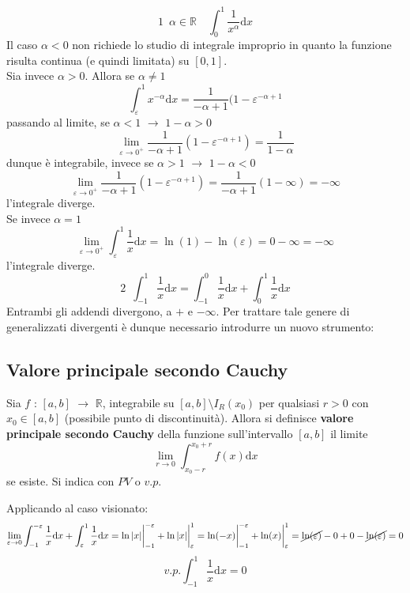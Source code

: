 \documentclass[10pt, oneside]{book}
\theoremstyle{plain}
\begin{document}
\[\boxed{1} \enspace \alpha \in \mathbb{R} \quad \int_0^1 \frac{1}{x^\alpha}\textrm{d}x\]
Il caso $\alpha < 0$ non richiede lo studio di integrale improprio in quanto la funzione risulta continua (e quindi limitata) su $[0,1]$.
\\Sia invece $\alpha > 0$. Allora se $\alpha \neq 1$
\[\int_\varepsilon^1 x^{-\alpha}\textrm{d}x = \frac{1}{-\alpha + 1}(1 - \varepsilon^{-\alpha + 1}\]
passando al limite, se $\alpha < 1$ $\rightarrow$ $1 - \alpha > 0$
\[\lim\limits_{\varepsilon \rightarrow 0^+} \frac{1}{-\alpha + 1}(1 - \varepsilon^{-\alpha + 1}) = \frac{1}{1 - \alpha}\]
dunque è integrabile, invece se $\alpha > 1$ $\rightarrow$ $1- \alpha <0$
\[\lim\limits_{\varepsilon \rightarrow 0^+} \frac{1}{-\alpha + 1}(1 - \varepsilon^{-\alpha + 1}) = \frac{1}{-\alpha + 1}(1 - \infty) = - \infty\]
l'integrale diverge.
\\Se invece $\alpha = 1$
\[\lim\limits_{\varepsilon \rightarrow 0^+} \int_\varepsilon^1 \frac{1}{x}\textrm{d}x = \ln(1) - \ln(\varepsilon) = 0 - \infty = - \infty\]
l'integrale diverge.
\[\boxed{2} \enspace \int_{-1}^1 \frac{1}{x}\textrm{d}x = \int_{-1}^0 \frac{1}{x}\textrm{d}x + \int_{0}^1 \frac{1}{x}\textrm{d}x\]
Entrambi gli addendi divergono, a $+$ e $- \infty$. Per trattare tale genere di generalizzati divergenti è dunque necessario introdurre un nuovo strumento:

\subsection{Valore principale secondo Cauchy}
\begin{defin}
    Sia $f$ : $[a,b]$ $\rightarrow$ $\mathbb{R}$, integrabile su $[a,b] \setminus I_R(x_0)$ per qualsiasi $r>0$ con $x_0 \in [a,b]$ (possibile punto di discontinuità). Allora si definisce \textbf{valore principale secondo Cauchy} della funzione sull'intervallo $[a,b]$ il limite
    \[\lim\limits_{r \rightarrow 0} \int_{x_0 - r}^{x_0 + r} f(x) \textrm{d}x\]
    se esiste. Si indica con $PV$ o $v.p.$
\end{defin}

Applicando al caso visionato:
\[\lim\limits_{\varepsilon \rightarrow 0} \int_{-1}^{-\varepsilon} \frac{1}{x}\textrm{d}x + \int_{\varepsilon}^1 \frac{1}{x}\textrm{d}x = \ln|x|\bigg|_{-1}^{-\varepsilon} + \ln|x|\bigg|_{\varepsilon}^1 = \ln(-x)\bigg|_{-1}^{-\varepsilon} + \ln(x)\bigg|_{\varepsilon}^1 = \cancel{\ln(\varepsilon)} - 0 + 0 - \cancel{\ln(\varepsilon)} = 0\]
\[v.p. \int_{-1}^1 \frac{1}{x}\textrm{d}x = 0\]
\end{document}
